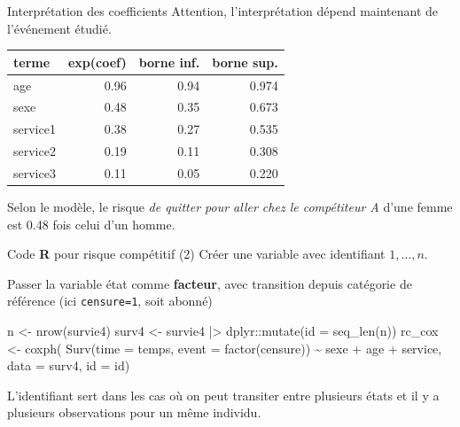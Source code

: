 \documentclass[
  ignorenonframetext,
]{beamer}
\newenvironment{Shaded}{\begin{snugshade}}{\end{snugshade}}
\newcommand{\AttributeTok}[1]{\textcolor[rgb]{0.40,0.45,0.13}{#1}}
\newcommand{\FunctionTok}[1]{\textcolor[rgb]{0.28,0.35,0.67}{#1}}
\newcommand{\NormalTok}[1]{\textcolor[rgb]{0.00,0.23,0.31}{#1}}
\newcommand{\OtherTok}[1]{\textcolor[rgb]{0.00,0.23,0.31}{#1}}
\newcommand{\SpecialCharTok}[1]{\textcolor[rgb]{0.37,0.37,0.37}{#1}}
\begin{document}
\begin{frame}{Interprétation des coefficients}
\protect{}\label{interpruxe9tation-des-coefficients}
Attention, l'interprétation dépend maintenant de l'événement étudié.

\begin{longtable*}[t]{lrrr}
\toprule
terme & exp(coef) & borne inf. & borne sup.\\
\midrule
age & 0.96 & 0.94 & 0.974\\
sexe & 0.48 & 0.35 & 0.673\\
service1 & 0.38 & 0.27 & 0.535\\
service2 & 0.19 & 0.11 & 0.308\\
service3 & 0.11 & 0.05 & 0.220\\
\bottomrule
\end{longtable*}

Selon le modèle, le risque \emph{de quitter pour aller chez le
compétiteur A} d'une femme est 0.48 fois celui d'un homme.
\end{frame}

\begin{frame}[fragile]{Code \textbf{R} pour risque compétitif (2)}
\protect{}\label{code-r-pour-risque-compuxe9titif-2}
Créer une variable avec identifiant \(1, \ldots, n\).

Passer la variable état comme \textbf{facteur}, avec transition depuis
catégorie de référence (ici \texttt{censure=1}, soit abonné)

\begin{Shaded}
\begin{Highlighting}[numbers=left,,]
\NormalTok{n }\OtherTok{\textless{}{-}} \FunctionTok{nrow}\NormalTok{(survie4)}
\NormalTok{surv4 }\OtherTok{\textless{}{-}}\NormalTok{ survie4 }\SpecialCharTok{|\textgreater{}} 
\NormalTok{  dplyr}\SpecialCharTok{::}\FunctionTok{mutate}\NormalTok{(}\AttributeTok{id =} \FunctionTok{seq\_len}\NormalTok{(n))}
\NormalTok{rc\_cox }\OtherTok{\textless{}{-}} \FunctionTok{coxph}\NormalTok{(}
  \FunctionTok{Surv}\NormalTok{(}\AttributeTok{time =}\NormalTok{ temps, }
       \AttributeTok{event =} \FunctionTok{factor}\NormalTok{(censure)) }\SpecialCharTok{\textasciitilde{}} 
\NormalTok{     sexe }\SpecialCharTok{+}\NormalTok{ age }\SpecialCharTok{+}\NormalTok{ service,}
  \AttributeTok{data =}\NormalTok{ surv4,}
  \AttributeTok{id =}\NormalTok{ id)}
\end{Highlighting}
\end{Shaded}

\footnotesize

L'identifiant sert dans les cas où on peut transiter entre plusieurs
états et il y a plusieurs observations pour un même individu.
\end{frame}
\end{document}
